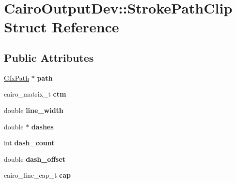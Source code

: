\hypertarget{struct_cairo_output_dev_1_1_stroke_path_clip}{}\section{Cairo\+Output\+Dev\+:\+:Stroke\+Path\+Clip Struct Reference}
\label{struct_cairo_output_dev_1_1_stroke_path_clip}
\subsection*{Public Attributes}
\begin{DoxyCompactItemize}
\item 
\mbox{\label{struct_cairo_output_dev_1_1_stroke_path_clip_a77c4c1850c6dca1e09811754c933631c}} 
\hyperlink{class_gfx_path}{Gfx\+Path} $\ast$ {\bfseries path}
\item 
\mbox{\label{struct_cairo_output_dev_1_1_stroke_path_clip_a6e463dbff97d5db2c7442a726ca29b73}} 
cairo\+\_\+matrix\+\_\+t {\bfseries ctm}
\item 
\mbox{\label{struct_cairo_output_dev_1_1_stroke_path_clip_ad31587d32eb1d920174cb83315193702}} 
double {\bfseries line\+\_\+width}
\item 
\mbox{\label{struct_cairo_output_dev_1_1_stroke_path_clip_ae2a92f1a51c36e72e284276ce9184b10}} 
double $\ast$ {\bfseries dashes}
\item 
\mbox{\label{struct_cairo_output_dev_1_1_stroke_path_clip_ada93093995771577788925b8fb7c0fb2}} 
int {\bfseries dash\+\_\+count}
\item 
\mbox{\label{struct_cairo_output_dev_1_1_stroke_path_clip_ae0d55a49767d68fa6a9a16669ab0c432}} 
double {\bfseries dash\+\_\+offset}
\item 
\mbox{\label{struct_cairo_output_dev_1_1_stroke_path_clip_a40a84ce05bd03dca3b8ed74fa9499fa2}} 
cairo\+\_\+line\+\_\+cap\+\_\+t {\bfseries cap}

\end{DoxyCompactItemize}
